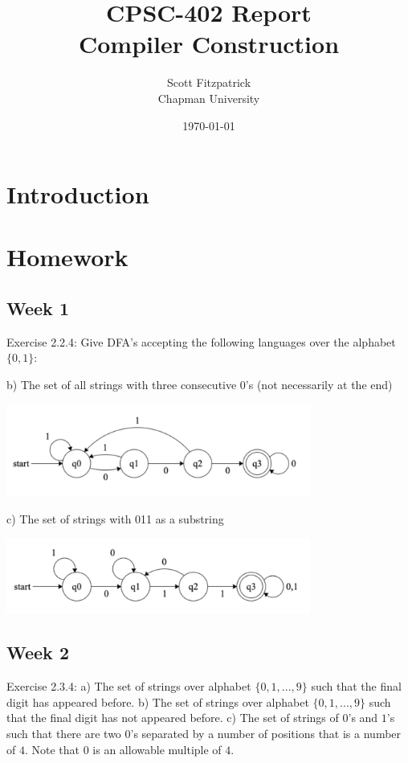 \documentclass{article}
\title{CPSC-402 Report\\Compiler Construction}
\author{Scott Fitzpatrick  \\ Chapman University}
\date{\today}
\theoremstyle{theorem}
\theoremstyle{definition}
\theoremstyle{remark}
\begin{document}
\maketitle

\begin{abstract}

\end{abstract}

\tableofcontents


\section{Introduction}\label{intro}


\section{Homework}\label{homework}

\subsection{Week 1}

\noindent
Exercise 2.2.4: Give DFA's accepting the following languages over the alphabet $\{0,1\}$:

\medskip
b) The set of all strings with three consecutive 0's (not necessarily at the end)

\includegraphics[width=0.75\textwidth]{Images/2.4.4b.png}

\medskip
c) The set of strings with 011 as a substring

\includegraphics[width=0.75\textwidth]{Images/2.4.4c.png}


\subsection{Week 2}

\noindent
Exercise 2.3.4: a) The set of strings over alphabet $\{0,1,..., 9\}$ such that the final digit has appeared before. b) The set of strings over alphabet $\{0,1,...,9\}$ such that the final digit has not appeared before. c) The set of strings of $0$'s and $1$'s such that there are two $0$'s separated by a number of positions that is a number of $4$. Note that $0$ is an allowable multiple of $4$.
\end{document}
